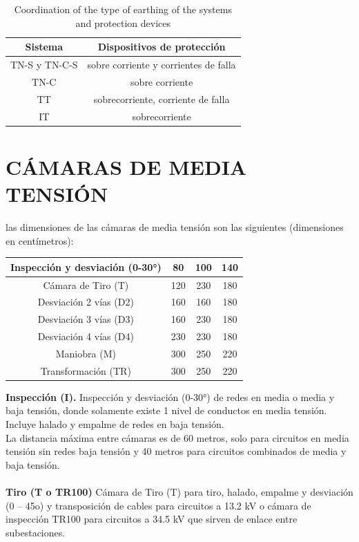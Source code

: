 \documentclass[a5paper]{book}%
\begin{document}
\begin{table}
	\caption{Coordination of the type of earthing of the systems and protection devices
		}
	\centering
	\begin{tabular}{|c|c|}
		\hline
		Sistema &Dispositivos de protección\\\hline
		TN-S y TN-C-S &sobre corriente  y corrientes de falla\\\hline
		TN-C & sobre corriente \\\hline
		TT & sobrecorriente, corriente de falla\\\hline
		IT & sobrecorriente \\\hline
	\end{tabular}
	
\end{table}


\section{CÁMARAS DE  MEDIA TENSIÓN}
las dimensiones de las cámaras de media tensión son las siguientes (dimensiones en centímetros):\\

\begin{tabular}{|c|c|c|c|}
\hline
Inspección y desviación (0-30°) & 80&100&140 \\\hline 
Cámara de Tiro (T) & 120&230&180 \\\hline
Desviación 2 vías (D2) & 160&160&180\\\hline
Desviación 3 vías (D3) &160&230&180  \\\hline
Desviación 4 vías (D4) & 230&230&180 \\\hline
Maniobra (M) & 300&250&220  \\\hline
Transformación (TR) & 300&250&220  \\\hline
\end{tabular}

 \textbf{Inspección (I).}
Inspección y desviación (0-30°) de redes en media o media y baja tensión, donde solamente existe 1 nivel de conductos en media tensión. Incluye halado y empalme de redes en baja tensión.\\
La distancia máxima entre cámaras es de 60 metros, solo para circuitos en media tensión sin redes baja tensión y 40 metros para circuitos combinados de media y baja tensión.\\\\

\textbf{Tiro (T o TR100)}
Cámara de Tiro (T) para tiro, halado, empalme y desviación (0 – 45o) y transposición de cables para circuitos a 13.2 kV o cámara de inspección TR100 para circuitos a 34.5 kV que sirven de enlace entre subestaciones.\\
\end{document}
